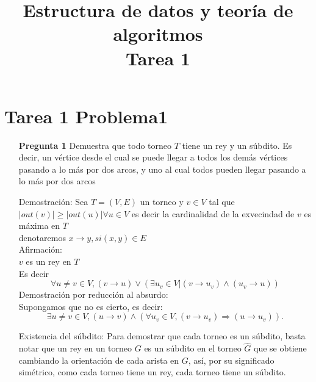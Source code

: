 \documentclass[12pt]{article}
\title{Estructura de datos y teoría de algoritmos\\
Tarea 1 }
\begin{document}
\lstset{language=python}
\maketitle

\section{Tarea 1 Problema1}
\begin{itemize}
  \item[\bf{Pregunta 1}] Demuestra que todo torneo $T$ tiene un rey y un súbdito. Es decir, un vértice desde el cual se puede llegar a todos los demás vértices pasando a lo más por dos arcos, y uno al cual todos pueden llegar pasando a lo más por dos arcos

  \item[Demostración:]
    Sea $T=(V,E)$ un torneo y $ v \in V $ tal que $|out(v)| \ge |out(u)| \forall u\in V $ es decir la cardinalidad de la exvecindad de $v$ es máxima en $T$\\
    denotaremos $x \rightarrow  y, si (x,y)\in E$\\
    Afirmación:\\
    $v$ es un rey en $T$\\
    Es decir $$\forall u\ne v \in V ,  (v\rightarrow u) \vee (\exists u_v \in V  |  (v \rightarrow u_v) \wedge (u_v \rightarrow u))$$
    Demostración por reducción al absurdo:\\
    Supongamos que no es cierto, es decir:
    $$\exists u\ne v \in V ,  (u \rightarrow v) \wedge (\forall u_v \in V  ,  (v \rightarrow u_v)  \Rightarrow (u \rightarrow u_v)  ).$$

  \item[Existencia del súbdito:]
    Para demostrar que cada torneo es un súbdito, basta notar que un rey en un torneo $G$ es un súbdito en el torneo $\widehat G$ que se obtiene cambiando la orientación de cada arista en $G$, así, por su significado simétrico, como cada torneo tiene un rey, cada torneo tiene un súbdito.\\

\end{itemize}
\end{document}
